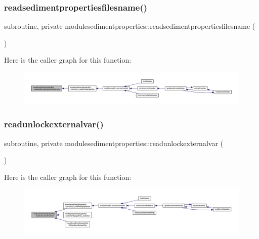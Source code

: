 \subsubsection{\texorpdfstring{readsedimentpropertiesfilesname()}{readsedimentpropertiesfilesname()}}
{\footnotesize\ttfamily subroutine, private modulesedimentproperties\+::readsedimentpropertiesfilesname (\begin{DoxyParamCaption}{ }\end{DoxyParamCaption})\hspace{0.3cm}{\ttfamily [private]}}

Here is the caller graph for this function\+:\nopagebreak
\begin{figure}[H]
\begin{center}
\leavevmode
\includegraphics[width=350pt]{namespacemodulesedimentproperties_a75f3289f9063b5325117a4d39bebace2_icgraph}
\end{center}
\end{figure}
\mbox{\label{namespacemodulesedimentproperties_a442696b0f51e8020b42b7a5c2af05721}} 
\subsubsection{\texorpdfstring{readunlockexternalvar()}{readunlockexternalvar()}}
{\footnotesize\ttfamily subroutine, private modulesedimentproperties\+::readunlockexternalvar (\begin{DoxyParamCaption}{ }\end{DoxyParamCaption})\hspace{0.3cm}{\ttfamily [private]}}

Here is the caller graph for this function\+:\nopagebreak
\begin{figure}[H]
\begin{center}
\leavevmode
\includegraphics[width=350pt]{namespacemodulesedimentproperties_a442696b0f51e8020b42b7a5c2af05721_icgraph}
\end{center}
\end{figure}
\mbox{\label{namespacemodulesedimentproperties_a0ac80b6b6970285688cd69f623317e33}} 
